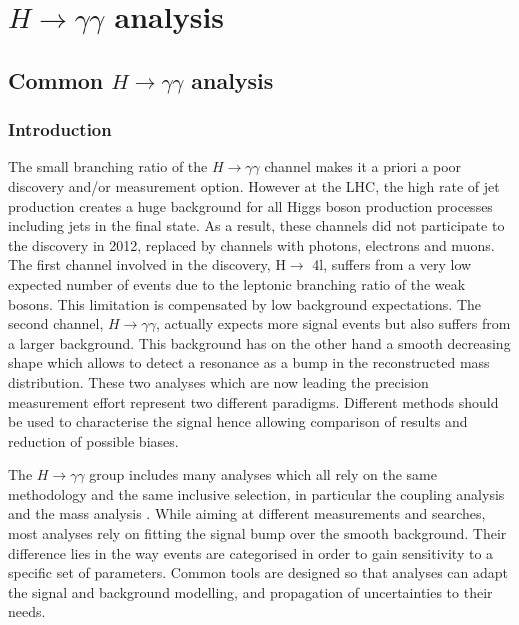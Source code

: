 \part{\(H\rightarrow\gamma\gamma\) analysis}
\label{sec:org3ff4562}

\label{HGam}

\chapter{Common \(H\rightarrow\gamma\gamma\) analysis}
\label{sec:orgb822321}

\section{Introduction}
\label{sec:org235a67d}
The small branching ratio of the $H\rightarrow\gamma\gamma$ channel makes it a priori a poor discovery and/or measurement option.
However at the LHC, the high rate of jet production creates a huge background for all Higgs boson production processes including jets in the final state.
As a result, these channels did not participate to the discovery in 2012, replaced by channels with photons, electrons and muons.
The first channel involved in the discovery, H\(\rightarrow\) 4l, suffers from a very low expected number of events due to the leptonic branching ratio of the weak bosons.
This limitation is compensated by low background expectations.
The second channel, $H\rightarrow\gamma\gamma$, actually expects more signal events but also suffers from a larger background.
This background has on the other hand a smooth decreasing shape which allows to detect a resonance as a bump in the reconstructed mass distribution.
These two analyses which are now leading the precision measurement effort represent two different paradigms.
Different methods should be used to characterise the signal hence allowing comparison of results and reduction of possible biases.


The $H\rightarrow\gamma\gamma$ group includes many analyses which all rely on the same methodology and the same inclusive selection, in particular the coupling analysis \cite{ATLAS-CONF-2017-045} and the mass analysis \cite{ATLAS-CONF-2017-046}.
While aiming at different measurements and searches, most analyses rely on fitting the signal bump over the smooth background.
Their difference lies in the way events are categorised in order to gain sensitivity to a specific set of parameters.
Common tools are designed so that analyses can adapt the signal and background modelling, and propagation of uncertainties to their needs.

